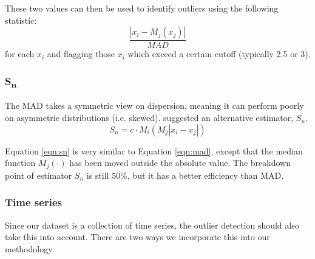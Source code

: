 \documentclass[11pt,twosided,a4paper]{report}
\begin{document}
These two values can then be used to identify outliers using the following statistic:
\begin{equation} \label{eqn:mad}
\frac{| x_i - M_j(x_j) |}{MAD}
\end{equation}
for each $x_i$ and flagging those $x_i$ which exceed a certain cutoff (typically 2.5 or 3).


\subsubsection{S\textsubscript{n}} \label{sn}

The MAD takes a symmetric view on dispersion, meaning it can perform poorly on asymmetric distributions (i.e. skewed). \cite{rousseeuw1993alternatives} suggested an alternative estimator, $S_n$.
\begin{equation} \label{eqn:sn}
S_n = c \cdot M_i ( M_j | x_i - x_j | )
\end{equation}

Equation \ref{eqn:sn} is very similar to Equation \ref{eqn:mad}, except that the median function $M_j(\cdot)$ has been moved outside the absolute value. The breakdown point of estimator $S_n$ is still 50\%, but it has a better efficiency than MAD.


\subsubsection{Time series} \label{time_series_incorp}

Since our dataset is a collection of time series, the outlier detection should also take this into account. There are two ways we incorporate this into our methodology.
\end{document}
